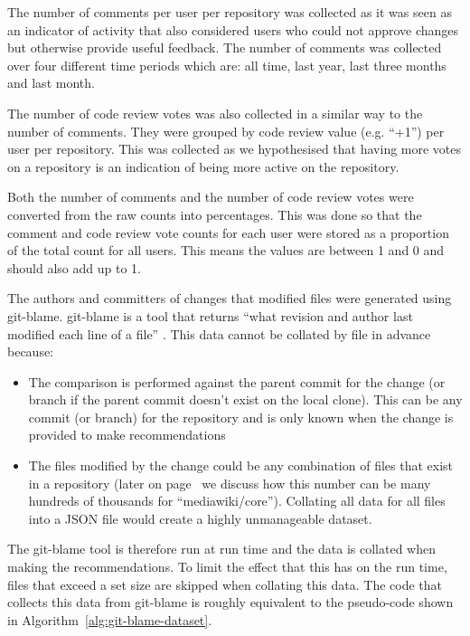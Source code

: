 The number of comments per user per repository was collected as it was seen as an indicator of activity that also considered users who could not approve changes but otherwise provide useful feedback. The number of comments was collected over four different time periods which are: all time, last year, last three months and last month.

The number of code review votes was also collected in a similar way to the number of comments. They were grouped by code review value (e.g. ``+1'') per user per repository. This was collected as we hypothesised that having more votes on a repository is an indication of being more active on the repository.

Both the number of comments and the number of code review votes were converted from the raw counts into percentages. This was done so that the comment and code review vote counts for each user were stored as a proportion of the total count for all users. This means the values are between 1 and 0 and should also add up to 1.

The authors and committers of changes that modified files were generated using git-blame. git-blame is a tool that returns ``what revision and author last modified each line of a file'' \citep{git:git-blame}. This data cannot be collated by file in advance because:
\begin{itemize}
    \item The comparison is performed against the parent commit for the change (or branch if the parent commit doesn't exist on the local clone). This can be any commit (or branch) for the repository and is only known when the change is provided to make recommendations
    \item The files modified by the change could be any combination of files that exist in a repository (later on page~\pageref{paragraph:mediawiki-core-being-large-in-file-count} we discuss how this number can be many hundreds of thousands for ``mediawiki/core''). Collating all data for all files into a JSON file would create a highly unmanageable dataset.
\end{itemize}

The git-blame tool is therefore run at run time and the data is collated when making the recommendations. To limit the effect that this has on the run time, files that exceed a set size are skipped when collating this data. The code that collects this data from git-blame is roughly equivalent to the pseudo-code shown in Algorithm~\ref{alg:git-blame-dataset}.

